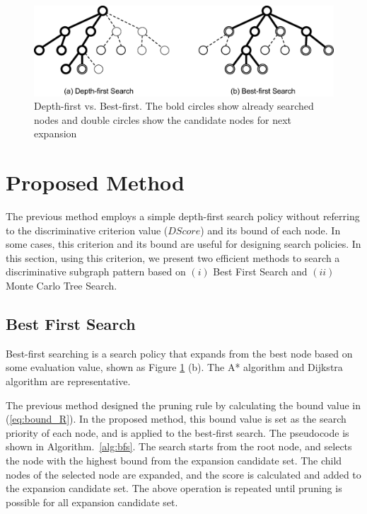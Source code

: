 \begin{figure}[t]
  	\centering
  	\includegraphics[width=0.9\linewidth]{img/search.eps}
	\caption{
		Depth-first vs. Best-first.
		The bold circles show already searched nodes and 
		double circles show the candidate nodes for next expansion}
  	\label{fig:search}
\end{figure}

\section{Proposed Method}
The previous method \cite{Shirakawa:2018} employs a simple depth-first search policy 
without referring to the discriminative criterion value ($DScore$) and its bound of each node.
In some cases, this criterion and its bound are useful for designing search policies.
In this section, using this criterion, 
we present two efficient methods to search a discriminative subgraph pattern 
based on $(i)$ Best First Search and $(ii)$ Monte Carlo Tree Search.

\subsection{Best First Search}
Best-first searching \cite{pearl:1984} is a search policy 
that expands from the best node based on some evaluation value, shown as Figure \ref{fig:search} (b).
The A* algorithm \cite{hart:1968} and Dijkstra algorithm \cite{dijkstra:1959} are representative.

The previous method designed the pruning rule 
by calculating the bound value in (\ref{eq:bound_R}). 
In the proposed method, this bound value is set as the search priority of each node, 
and is applied to the best-first search.
The pseudocode is shown in Algorithm.~\ref{alg:bfs}.
The search starts from the root node, 
and selects the node with the highest bound from the expansion candidate set.
The child nodes of the selected node are expanded, 
and the score is calculated and added to the expansion candidate set.
The above operation is repeated until pruning is possible for all expansion candidate set.\\

